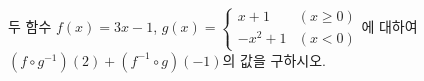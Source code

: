 두 함수 $f(x)=3x-1$, $g(x)=\begin{cases} x+1 & (x\ge 0) \\ -x^2+1 & (x<0) \end{cases}$에 대하여 $(f\circ g^{-1})(2)+(f^{-1}\circ g)(-1)$의 값을 구하시오.
